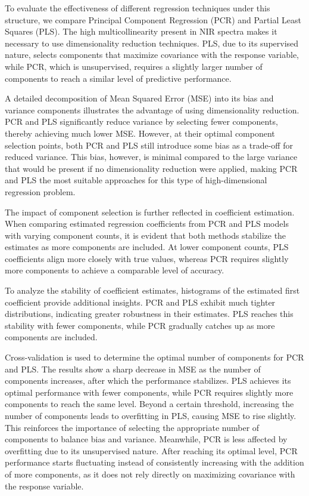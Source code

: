 \documentclass[11pt,twoside,a4paper]{article}
\begin{document}
To evaluate the effectiveness of different regression techniques under this structure, we compare Principal Component Regression (PCR) and Partial Least Squares (PLS). The high multicollinearity present in NIR spectra makes it necessary to use dimensionality reduction techniques. PLS, due to its supervised nature, selects components that maximize covariance with the response variable, while PCR, which is unsupervised, requires a slightly larger number of components to reach a similar level of predictive performance.

A detailed decomposition of Mean Squared Error (MSE) into its bias and variance components illustrates the advantage of using dimensionality reduction. PCR and PLS significantly reduce variance by selecting fewer components, thereby achieving much lower MSE. However, at their optimal component selection points, both PCR and PLS still introduce some bias as a trade-off for reduced variance. This bias, however, is minimal compared to the large variance that would be present if no dimensionality reduction were applied, making PCR and PLS the most suitable approaches for this type of high-dimensional regression problem.

The impact of component selection is further reflected in coefficient estimation. When comparing estimated regression coefficients from PCR and PLS models with varying component counts, it is evident that both methods stabilize the estimates as more components are included. At lower component counts, PLS coefficients align more closely with true values, whereas PCR requires slightly more components to achieve a comparable level of accuracy.

To analyze the stability of coefficient estimates, histograms of the estimated first coefficient provide additional insights. PCR and PLS exhibit much tighter distributions, indicating greater robustness in their estimates. PLS reaches this stability with fewer components, while PCR gradually catches up as more components are included.

Cross-validation is used to determine the optimal number of components for PCR and PLS. The results show a sharp decrease in MSE as the number of components increases, after which the performance stabilizes. PLS achieves its optimal performance with fewer components, while PCR requires slightly more components to reach the same level. Beyond a certain threshold, increasing the number of components leads to overfitting in PLS, causing MSE to rise slightly. This reinforces the importance of selecting the appropriate number of components to balance bias and variance. Meanwhile, PCR is less affected by overfitting due to its unsupervised nature. After reaching its optimal level, PCR performance starts fluctuating instead of consistently increasing with the addition of more components, as it does not rely directly on maximizing covariance with the response variable.
\end{document}
